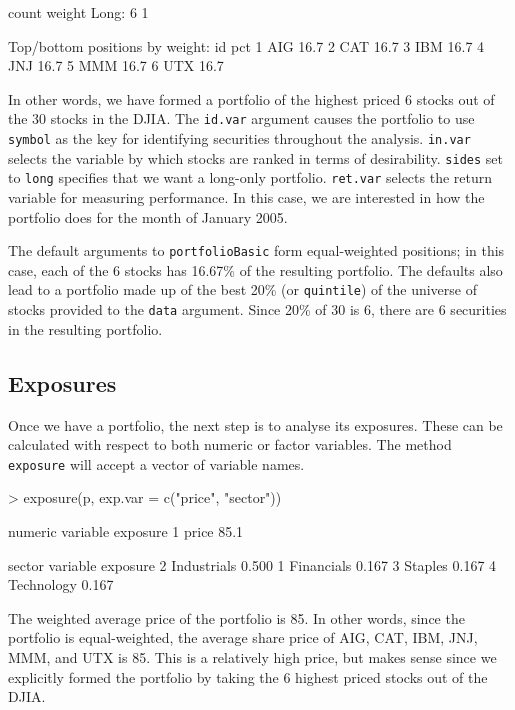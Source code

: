 \documentclass[a4paper]{report}
\begin{document}
\begin{article}
\begin{Schunk}
\begin{Soutput}
        count       weight
Long:       6            1 

Top/bottom positions by weight:
   id  pct
1 AIG 16.7
2 CAT 16.7
3 IBM 16.7
4 JNJ 16.7
5 MMM 16.7
6 UTX 16.7
\end{Soutput}
\end{Schunk}

In other words, we have formed a portfolio of the highest priced 6
stocks out of the 30 stocks in the DJIA. The \texttt{id.var} argument
causes the portfolio to use \texttt{symbol} as the key for identifying
securities throughout the analysis. \texttt{in.var} selects the
variable by which stocks are ranked in terms of desirability.
\texttt{sides} set to \texttt{long} specifies that we want a long-only
portfolio. \texttt{ret.var} selects the return variable for measuring
performance. In this case, we are interested in how the portfolio does
for the month of January 2005.

The default arguments to \texttt{portfolioBasic} form equal-weighted
positions; in this case, each of the 6 stocks has 16.67\% of the
resulting portfolio. The defaults also lead to a portfolio made up of
the best 20\% (or \texttt{quintile}) of the universe of stocks
provided to the \texttt{data} argument. Since 20\% of 30 is 6, there
are 6 securities in the resulting portfolio.


\subsection*{Exposures}

Once we have a portfolio, the next step is to analyse its exposures.
These can be calculated with respect to both numeric or factor
variables.  The method \texttt{exposure} will accept a vector of
variable names.

\begin{Schunk}
\begin{Sinput}
> exposure(p, exp.var = c("price", "sector"))
\end{Sinput}
\begin{Soutput}
numeric 
  variable exposure
1    price     85.1

sector 
     variable exposure
2 Industrials    0.500
1  Financials    0.167
3     Staples    0.167
4  Technology    0.167
\end{Soutput}
\end{Schunk}

The weighted average price of the portfolio is 85. In other words,
since the portfolio is equal-weighted, the average share price of AIG,
CAT, IBM, JNJ, MMM, and UTX is 85. This is a relatively high price,
but makes sense since we explicitly formed the portfolio by taking the
6 highest priced stocks out of the DJIA.


\end{article}
\end{document}
